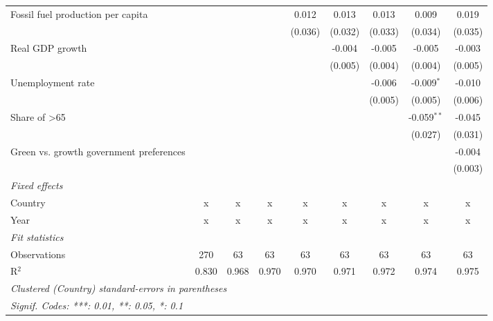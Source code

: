 \begin{table}[htbp]
\begin{tabular}{lcccccccc}
      Fossil fuel production per capita                       &         &         &         & 0.012   & 0.013   & 0.013   & 0.009         & 0.019\\   
                                                              &         &         &         & (0.036) & (0.032) & (0.033) & (0.034)       & (0.035)\\   
      Real GDP growth                                         &         &         &         &         & -0.004  & -0.005  & -0.005        & -0.003\\   
                                                              &         &         &         &         & (0.005) & (0.004) & (0.004)       & (0.005)\\   
      Unemployment rate                                       &         &         &         &         &         & -0.006  & -0.009$^{*}$  & -0.010\\   
                                                              &         &         &         &         &         & (0.005) & (0.005)       & (0.006)\\   
      Share of >65                                            &         &         &         &         &         &         & -0.059$^{**}$ & -0.045\\   
                                                              &         &         &         &         &         &         & (0.027)       & (0.031)\\   
      Green vs. growth government preferences                 &         &         &         &         &         &         &               & -0.004\\   
                                                              &         &         &         &         &         &         &               & (0.003)\\   
      \emph{Fixed effects}\\
      Country                                                 & x       & x       & x       & x       & x       & x       & x             & x\\  
      Year                                                    & x       & x       & x       & x       & x       & x       & x             & x\\  
      \midrule \emph{Fit statistics}\\
      Observations                                            & 270     & 63      & 63      & 63      & 63      & 63      & 63            & 63\\  
      R$^2$                                                   & 0.830   & 0.968   & 0.970   & 0.970   & 0.971   & 0.972   & 0.974         & 0.975\\  
      \midrule
      \multicolumn{9}{l}{\emph{Clustered (Country) standard-errors in parentheses}}\\
      \multicolumn{9}{l}{\emph{Signif. Codes: ***: 0.01, **: 0.05, *: 0.1}}\\
   \end{tabular}
\end{table}


